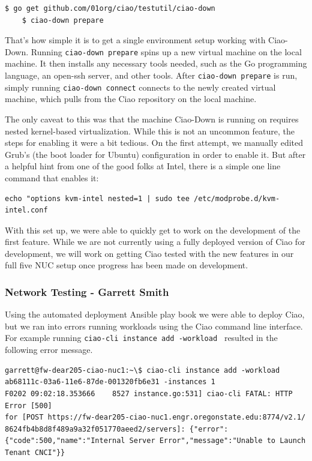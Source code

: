 \documentclass[10pt,onecolumn,journal,draftclsnofoot]{IEEEtran}
\begin{document}
\begin{lstlisting}[caption = Simplicity of Ciao-Down setup]
	$ go get github.com/01org/ciao/testutil/ciao-down
	$ ciao-down prepare

\end{lstlisting}

That's how simple it is to get a single environment setup working with 
Ciao-Down. Running \texttt{ciao-down prepare} spins up a new virtual machine
on the local machine. It then installs any necessary tools needed, such as the
Go programming language, an open-ssh server, and other tools. After 
\texttt{ciao-down prepare} is run, simply running
\texttt{ciao-down connect} connects to the newly created virtual machine, which
pulls from the Ciao repository on the local machine.

The only caveat to this was that the machine Ciao-Down is running on requires
nested kernel-based virtualization. While this is not an uncommon feature, the
steps for enabling it were a bit tedious. On the first attempt, we manually
edited Grub's (the boot loader for Ubuntu) configuration in order to enable it.
But after a helpful hint from one of the good folks at Intel, there is a simple
one line command that enables it:

\begin{lstlisting}[caption = An easy way to enable nested KVM support]
	echo "options kvm-intel nested=1 | sudo tee /etc/modprobe.d/kvm-intel.conf
\end{lstlisting}


With this set up, we were
able to quickly get to work on the development of the first feature. While we
are not currently using a fully deployed version of Ciao for development, we
will work on getting Ciao tested with the new features in our full five NUC
setup once progress has been made on development.

\subsubsection{Network Testing - Garrett Smith}

Using the automated deployment Ansible play book we were able to deploy Ciao,
but we ran into errors running workloads using the Ciao command line interface.
For example running \texttt{ciao-cli instance add -workload } resulted in the
following error message.

\begin{lstlisting}[caption = Failing to run a workload]
garrett@fw-dear205-ciao-nuc1:~\$ ciao-cli instance add -workload ab68111c-03a6-11e6-87de-001320fb6e31 -instances 1
F0202 09:02:18.353666    8527 instance.go:531] ciao-cli FATAL: HTTP Error [500] 
for [POST https://fw-dear205-ciao-nuc1.engr.oregonstate.edu:8774/v2.1/
8624fb4b8d8f489a9a32f051770aeed2/servers]: {"error":{"code":500,"name":"Internal Server Error","message":"Unable to Launch Tenant CNCI"}}
\end{lstlisting}
\end{document}
